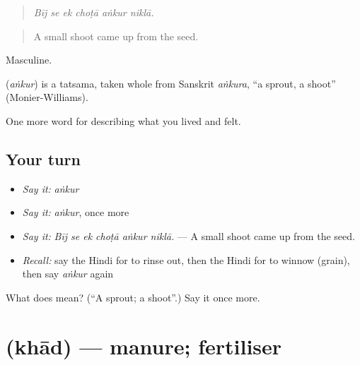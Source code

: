\begin{quote}
     
\end{quote}

\begin{quote}
\emph{Bīj se ek choṭā aṅkur niklā.}
\end{quote}

\begin{quote}
A small shoot came up from the seed.
\end{quote}

Masculine.

\begin{cousinweb}
\textbf{} (\emph{aṅkur}) is a tatsama, taken whole from Sanskrit \emph{aṅkura}, \textquotedblleft{}a sprout, a shoot\textquotedblright{} (Monier-Williams).
\end{cousinweb}

\begin{grammarlens}[title={What you've built}]
One more word for describing what you lived and felt.
\end{grammarlens}

\subsection*{Your turn}
\begin{itemize}
\raggedright
  \item \emph{Say it:} \emph{aṅkur}
  \item \emph{Say it:} \emph{aṅkur}, once more
  \item \emph{Say it:} \emph{Bīj se ek choṭā aṅkur niklā.} — A small shoot came up from the seed.
  \item \emph{Recall:} say the Hindi for to rinse out, then the Hindi for to winnow (grain), then say \emph{aṅkur} again
\end{itemize}

\begin{tcolorbox}[breakable,colback=teal!4,colframe=teal!35!black,title={Before you move on}]
What does  mean? (\textquotedblleft{}A sprout; a shoot\textquotedblright{}.) Say it once more.
\end{tcolorbox}
\section[\texorpdfstring{\hi{खाद} (khād)}{खाद (khād)}]{ (khād) — manure; fertiliser}

\label{lesson:HI-C525-khad}



